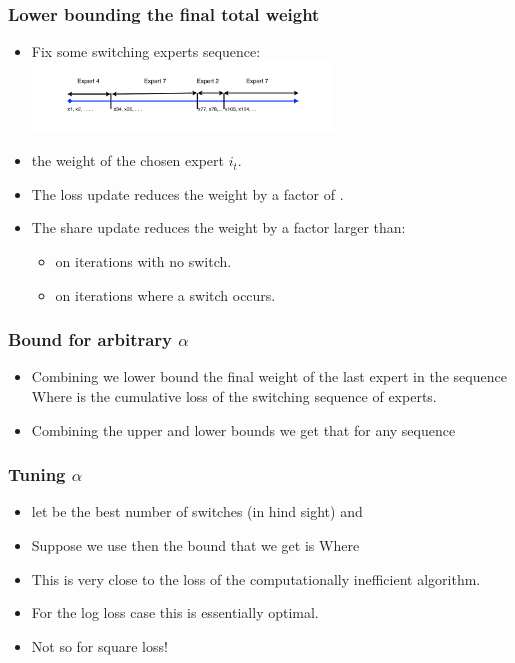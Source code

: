 \documentclass{beamer}
\begin{document}
\begin{frame}
\frametitle{Lower bounding the final total weight}
\begin{itemize}
\item Fix some switching experts sequence:
\includegraphics[width=8cm]{figures/SwitchingExperts.pdf}
\item {} the weight of the chosen expert $i_t$.
\item The loss update reduces the weight by a factor of .
\item The share update reduces the weight by a factor larger than:
\begin{itemize}
\item {} on iterations with no switch.
\item {} on iterations where a switch occurs.
\end{itemize}
\end{itemize}
\end{frame}

\begin{frame}
\frametitle{Bound for arbitrary $\alpha$}
\begin{itemize}
\item
Combining we lower bound the final weight of the last expert in the sequence
Where  is the cumulative loss of the switching sequence of experts.
\item
Combining the upper and lower bounds we get that for any sequence 
\end{itemize}
\end{frame}

\begin{frame}
\frametitle{Tuning $\alpha$}
\begin{itemize}
\item let  be the best number of switches (in hind sight) 
and 
\item Suppose we use \R{$\alpha \approx \alpha^*$} then the bound that we get is
Where
\R{
\[
H(\alpha^*) = -\alpha^* \ln \alpha^* - (1-\alpha^*) \ln (1-\alpha^*)
\]
\[
D_{\text{KL}}(\alpha^* || \alpha) = 
\alpha^* \ln \frac{\alpha^*}{\alpha}  (1-\alpha^*) \ln \frac{1-\alpha^*}{1-\alpha}
\]
}
\item This is very close to the loss of the computationally inefficient algorithm.
\item For the log loss case this is essentially optimal.
\item Not so for square loss!
\end{itemize}
\end{frame}
\end{document}
